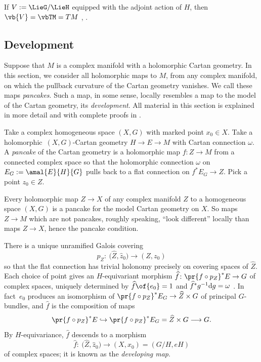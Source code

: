 \begin{Example} If $V := \LieG/\LieH$ equipped with the adjoint action of $H$, then $\vb{V} = \vbTM = TM$
\cite[Proposition 1]{mckay2023introduction}, \cite[Theorem 3.15]{Sharpe:1997}.
\end{Example}

\subsection{Development}\label{subsection:Development}
Suppose that $M$ is a complex manifold with a holomorphic Cartan geometry.
In this section, we consider all holomorphic maps to $M$, from any complex manifold, on which the pullback curvature of the Cartan geometry vanishes.
We call these maps \emph{pancakes}.
Such a map, in some sense, locally resembles a map to the model of the Cartan geometry, its \emph{development}.
All material in this section is explained in more detail and with complete proofs
in \cite[Section 7]{mckay2023introduction}.

Take a complex homogeneous space $(X, G)$ with marked point $x_0 \in X$.
Take a holomorphic~$(X, G)$-Cartan geometry $H \longrightarrow
E \to M$ with Cartan connection $\omega$.
A \emph{pancake} of the Cartan geometry is a holomorphic map $f \colon Z \longrightarrow
 M$ from a connected complex space so that the holomorphic connection $\omega$ on $E_G := \amal{E}{H}{G}$ pulls back to a flat
connection on $f^* E_G \to Z$. Pick a point $z_0 \in Z$.
\begin{Example}
Every holomorphic map $Z\to X$ of any complex manifold $Z$ to a homogeneous space $(X,G)$ is a pancake for the model Cartan geometry on $X$.
So maps $Z\to M$ which are not pancakes, roughly speaking, ``look different'' locally than maps $Z\to X$, hence the pancake condition.
\end{Example}
There is a unique unramified Galois covering
\[
p_Z \colon \ \big(\widehat{Z}, \widehat{z}_0\big) \to (Z, z_0)
\]
so that the flat connection has trivial holonomy precisely on covering spaces of $\widehat{Z}$.
Each choice of point  gives an $H$-equivariant morphism $\widehat{f} \colon
 \pr{f \circ p_Z}^*E \to G$ of complex spaces, uniquely determined by
$
\widehat{f}\of{e_0} = 1
$
and $\widehat{f}^* g^{-1} {\rm d}g = \omega$ \cite[Section 2.3]{Biswas.McKay:2016}. In fact~$e_0$ produces an
isomorphism of $\pr{f \circ p_Z}^*E_G \to \widehat{Z}\times G$ of principal $G$-bundles, and
$\widehat{f}$ is the composition of maps
\[
\pr{f \circ p_Z}^*E \hookrightarrow \pr{f \circ p_Z}^*E_G = \widehat{Z}\times G \longrightarrow G.
\]
By $H$-equivariance, $\widehat{f}$ descends to a morphism
\begin{equation}\label{ed}
\widehat{f} \colon \ \big(\widehat{Z}, \widehat{z}_0\big)
\to (X, x_0) = (G/H, eH)
\end{equation}
of complex spaces; it is known as the \emph{developing map}.

